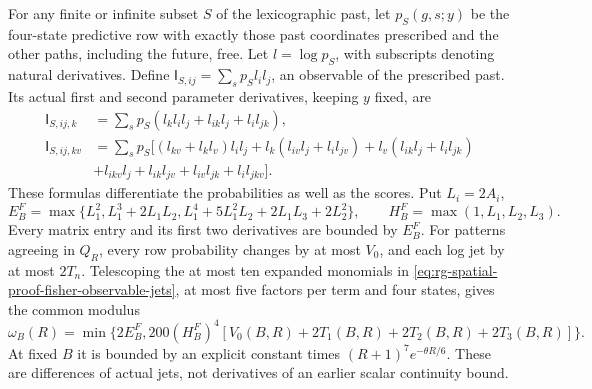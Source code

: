 For any finite or infinite subset \(S\) of the lexicographic past, let
\(p_S(g,s;y)\) be the four-state predictive row with exactly those past
coordinates prescribed and the other paths, including the future, free.
Let \(l=\log p_S\), with subscripts denoting natural derivatives. Define
\(\mathsf I_{S,ij}=\sum_sp_Sl_il_j\), an observable of the prescribed
past. Its actual first and second parameter derivatives, keeping \(y\)
fixed, are
\begin{equation}
 \begin{split}
 \mathsf I_{S,ij,k}
 &=\sum_sp_S(l_kl_il_j+l_{ik}l_j+l_il_{jk}),\\
 \mathsf I_{S,ij,kv}
 &=\sum_sp_S\bigl[(l_{kv}+l_kl_v)l_il_j
 +l_k(l_{iv}l_j+l_il_{jv})+l_v(l_{ik}l_j+l_il_{jk})\\
 &+l_{ikv}l_j+l_{ik}l_{jv}+l_{iv}l_{jk}+l_il_{jkv}\bigr].
 \end{split}
 \label{eq:rg-spatial-proof-fisher-observable-jets}
\end{equation}
These formulas differentiate the probabilities as well as the scores.
Put \(L_i=2A_i\),
\begin{equation}
 E_B^F=\max\{L_1^2,L_1^3+2L_1L_2,
                L_1^4+5L_1^2L_2+2L_1L_3+2L_2^2\},\qquad
 H_B^F=\max(1,L_1,L_2,L_3).
 \label{eq:rg-spatial-proof-fisher-observable-bound}
\end{equation}
Every matrix entry and its first two derivatives are bounded by
\(E_B^F\). For patterns agreeing in \(Q_R\), every row probability
changes by at most \(V_0\), and each log jet by at most \(2T_n\).
Telescoping the at most ten expanded monomials in
\cref{eq:rg-spatial-proof-fisher-observable-jets}, at most five factors
per term and four states, gives the common modulus
\begin{equation}
 \omega_B(R)=\min\{2E_B^F,
 200(H_B^F)^4[V_0(B,R)+2T_1(B,R)+2T_2(B,R)+2T_3(B,R)]\}.
 \label{eq:rg-spatial-proof-fisher-observable-modulus}
\end{equation}
At fixed \(B\) it is bounded by an explicit constant times
\((R+1)^7e^{-\theta R/6}\). These are differences of actual jets,
not derivatives of an earlier scalar continuity bound.

